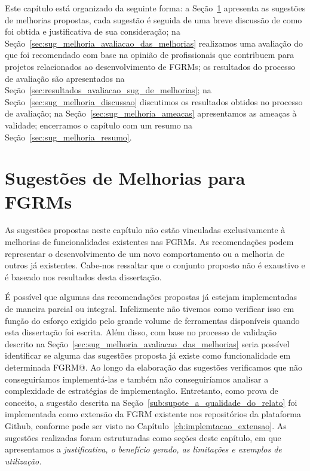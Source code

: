 Este capítulo está organizado da seguinte forma: a
Seção~\ref{sec:sug_melhoria_melhorando_as_ferraementas} apresenta as sugestões
de melhorias propostas, cada sugestão é seguida de uma breve discussão de como
foi obtida e justificativa de sua consideração; na
Seção~\ref{sec:sug_melhoria_avaliacao_das_melhorias} realizamos uma avaliação
do que foi recomendado com base na opinião de profissionais que contribuem para
projetos relacionados ao desenvolvimento de FGRMs; os resultados do processo de
avaliação são apresentados na
Seção~\ref{sec:resultados_avaliacao_sug_de_melhorias}; na
Seção~\ref{sec:sug_melhoria_discussao} discutimos os resultados obtidos no
processo de avaliação; na Seção~\ref{sec:sug_melhoria_ameacas} apresentamos as
ameaças à validade; encerramos o capítulo com um resumo na
Seção~\ref{sec:sug_melhoria_resumo}.

\section{Sugestões de Melhorias para FGRMs}\label{sec:sug_melhoria_melhorando_as_ferraementas}

As sugestões propostas neste capítulo não estão vinculadas exclusivamente à
melhorias de funcionalidades existentes nas FGRMs. As recomendações podem
representar o desenvolvimento de um novo comportamento ou a melhoria de outros
já existentes. Cabe-nos ressaltar que o conjunto proposto não é exaustivo e é
baseado nos resultados desta dissertação.

É possível que algumas das recomendações propostas já estejam implementadas de
maneira parcial ou integral. Infelizmente não tivemos como verificar isso em
função do esforço exigido pelo grande volume de ferramentas disponíveis quando
esta dissertação foi escrita. Além disso, com base no processo de validação
descrito na Seção~\ref{sec:sug_melhoria_avaliacao_das_melhorias} seria possível
identificar se alguma das sugestões proposta já existe como funcionalidade em
determinada FGRM@. Ao longo da elaboração das sugestões verificamos que não
conseguiríamos implementá-las e também não conseguiríamos analisar a
complexidade de estratégias de implementação. Entretanto, como prova de
conceito, a sugestão descrita na Seção~\ref{sub:supote_a_qualidade_do_relato}
foi implementada como extensão da FGRM existente nos repositórios da plataforma
Github, conforme pode ser visto no Capítulo~\ref{ch:implemtacao_extensao}. As
sugestões realizadas foram estruturadas como seções deste capítulo, em que
apresentamos a \textit{justificativa, o benefício gerado, as limitações e
    exemplos de utilização.}

